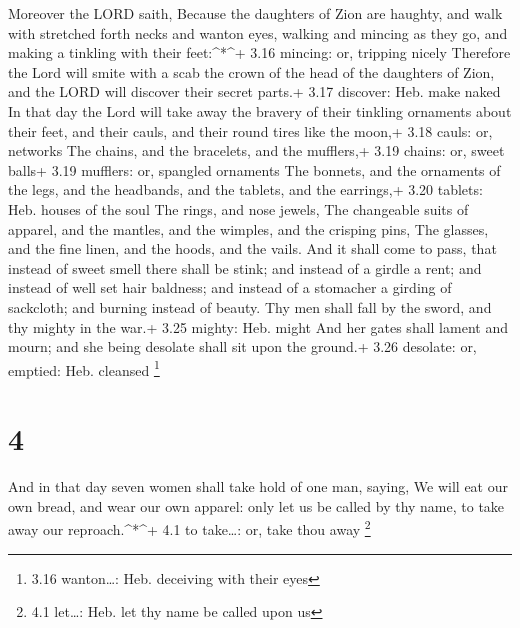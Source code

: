  Moreover the LORD saith, Because the daughters of Zion are
haughty, and walk with stretched forth necks and wanton eyes, walking
and mincing as they go, and making a tinkling with their feet:\^{}*\^{}+
3.16 mincing: or, tripping nicely  Therefore the Lord will
smite with a scab the crown of the head of the daughters of Zion, and
the LORD will discover their secret parts.+ 3.17 discover: Heb. make
naked  In that day the Lord will take away the bravery of
their tinkling ornaments about their feet, and their cauls, and their
round tires like the moon,+ 3.18 cauls: or, networks  The
chains, and the bracelets, and the mufflers,+ 3.19 chains: or, sweet
balls+ 3.19 mufflers: or, spangled ornaments  The bonnets,
and the ornaments of the legs, and the headbands, and the tablets, and
the earrings,+ 3.20 tablets: Heb. houses of the soul  The
rings, and nose jewels,  The changeable suits of apparel,
and the mantles, and the wimples, and the crisping pins, 
The glasses, and the fine linen, and the hoods, and the vails.
 And it shall come to pass, that instead of sweet smell
there shall be stink; and instead of a girdle a rent; and instead of
well set hair baldness; and instead of a stomacher a girding of
sackcloth; and burning instead of beauty.  Thy men shall
fall by the sword, and thy mighty in the war.+ 3.25 mighty: Heb. might
 And her gates shall lament and mourn; and she being
desolate shall sit upon the ground.+ 3.26 desolate: or, emptied: Heb.
cleansed \footnote{3.16 wanton\ldots: Heb. deceiving with their eyes}

\hypertarget{section-3}{%
\section{4}\label{section-3}}

 And in that day seven women shall take hold of one man,
saying, We will eat our own bread, and wear our own apparel: only let us
be called by thy name, to take away our reproach.\^{}*\^{}+ 4.1 to
take\ldots: or, take thou away \footnote{4.1 let\ldots: Heb. let thy
  name be called upon us}

